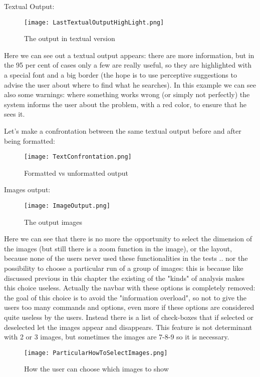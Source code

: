 Textual Output:

\begin{figure}[H]
\centering
\texttt{[image: LastTextualOutputHighLight.png]} 
\caption{The output in textual version}
\end{figure}  

Here we can see out a textual output appears: there are more information, but in the 95 per cent of cases only a few are really useful, so they are highlighted with a special font and a big border (the hope is to use perceptive suggestions to advise the user about where to find what he searches). In this example we can see also some warnings: where something works wrong (or simply not perfectly) the system informs the user about the problem, with a red color, to ensure that he sees it. 

Let's make a confrontation between the same textual output before and after being formatted:

\begin{figure}[H]
\centering
\texttt{[image: TextConfrontation.png]} 
\caption{Formatted vs unformatted output}
\end{figure}  


Images output:

\begin{figure}[H]
\centering
\texttt{[image: ImageOutput.png]} 
\caption{The output images}
\end{figure}  

Here we can see that there is no more the opportunity to select the dimension of the images (but still there is a zoom function in the image), or the layout, because none of the users never used these functionalities in the tests .. nor the possibility to choose a particular run of a group of images: this is because like discussed previous in this chapter the existing of the "kinds" of analysis makes this choice useless. Actually the navbar with these options is completely removed: the goal of this choice is to avoid the "information overload", so not to give the users too many commands and options, even more if these options are considered quite useless by the users.
Instead there is a list of check-boxes that if selected or deselected let the images appear and disappears. This feature is not determinant with 2 or 3 images, but sometimes the images are 7-8-9 so it is necessary.

\begin{figure}[H]
\centering
\texttt{[image: ParticularHowToSelectImages.png]} 
\caption{How the user can choose which images to show}
\end{figure}


